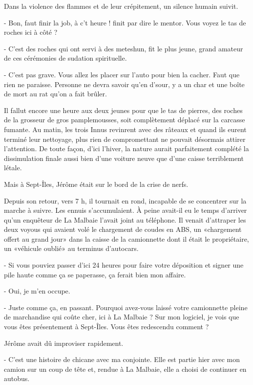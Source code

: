 Dans la violence des flammes et de leur crépitement, un silence humain suivit.

- Bon, faut finir la job, à c’t heure ! finit par dire le mentor. Vous voyez le tas de roches ici à côté ?

- C’est des roches qui ont servi à des meteshun, fit le plus jeune, grand amateur de ces cérémonies de sudation spirituelle.

- C’est pas grave. Vous allez les placer sur l’auto pour bien la cacher. Faut que rien ne paraisse.
Personne ne devra savoir qu’en d’sour, y a un char et une boîte de mort au rat qu’on a fait brûler.

Il fallut encore une heure aux deux jeunes pour que le tas de pierres, des roches de la grosseur de gros pamplemousses, soit complètement déplacé sur la carcasse fumante. Au matin, les trois Innus revinrent avec des râteaux et quand ils eurent terminé leur nettoyage, plus rien de compromettant ne pouvait désormais attirer l’attention. De toute façon, d’ici l’hiver, la nature aurait parfaitement complété la dissimulation finale aussi bien d’une voiture neuve que d’une caisse terriblement létale.

Mais à Sept-Îles, Jérôme était sur le bord de la crise de nerfs.

Depuis son retour, vers 7 h, il tournait en rond, incapable de se concentrer sur la marche à suivre. Les ennuis s’accumulaient. À peine avait-il eu le temps d’arriver qu’un enquêteur de La Malbaie l’avait joint au téléphone. Il venait d’attraper les deux voyous qui avaient volé le chargement de coudes en ABS, un «chargement offert au grand jour» dans la caisse de la camionnette dont il était le propriétaire, un «véhicule oublié» au terminus d’autocars.

- Si vous pouviez passer d’ici 24 heures pour faire votre déposition et signer une pile haute comme ça se paperasse, ça ferait bien mon affaire.

- Oui, je m’en occupe.

- Juste comme ça, en passant. Pourquoi avez-vous laissé votre camionnette pleine de marchandise qui coûte cher, ici à La Malbaie ? Sur mon logiciel, je vois que vous êtes présentement à Sept-Îles. Vous êtes redescendu comment ?

Jérôme avait dû improviser rapidement.

- C’est une histoire de chicane avec ma conjointe. Elle est partie hier avec mon camion sur un coup de tête et, rendue à La Malbaie, elle a choisi de continuer en autobus.

